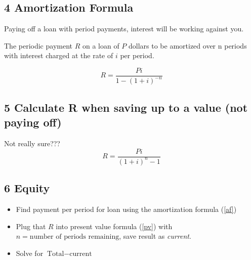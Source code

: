 \documentclass[twocolumn]{article}
\begin{document}
	\subsection*{4 Amortization Formula}
	Paying off a loan with period payments, interest will be working against you.
	
	The periodic payment $R$ on a loan of $P$ dollars to be amortized over n periods with interest charged at the rate of $i$ per period.
	
	\begin{equation} \label{af}
		R = \frac{Pi}{1-(1+i)^{-n}}
	\end{equation}

	\subsection*{5 Calculate R when saving up to a value (not paying off)}
	Not really sure???
	\begin{equation}
		R = \frac{Pi}{(1+i)^n-1}
	\end{equation}

	\subsection*{6 Equity}
	
	\begin{itemize}[label=--]
		\item Find payment per period for loan using the amortization formula (\ref{af})
		\item Plug that $R$ into present value formula (\ref{pv}) with $n = \text{number of periods remaining}$, save result as \emph{current}.
		\item Solve for $\text{Total} - \text{current}$
	\end{itemize}
\end{document}
